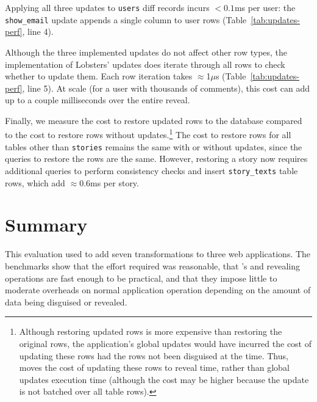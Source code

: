 %
Applying all three updates to \texttt{users} diff records incurs $<0.1$ms per
user: the \texttt{show\_email} update appends a single column to user rows
(Table~\ref{tab:updates-perf}, line 4).
%

%
Although the three implemented updates do not affect other row types, the
implementation of Lobsters' updates does iterate through all rows to check
whether to update them. Each row iteration takes $\approx$1$\mu$s (Table~\ref{tab:updates-perf}, line 5). At scale (\eg for a user with thousands
of comments), this cost can add up to a couple milliseconds over the entire
reveal.
%

Finally, we measure the cost to restore updated rows to the database compared to
the cost to restore rows without updates.\footnote{Although restoring updated
rows is more expensive than restoring the original rows, the application's
global updates would have incurred the cost of updating these rows had the rows not
been disguised at the time. Thus, \sys moves the cost of updating these rows to
reveal time, rather than global updates execution time (although the cost may be higher
because the update is not batched over all table rows).}
%
The cost to restore rows for all tables other than \texttt{stories} remains the
same with or without updates, since the queries to restore the rows are the
same.  However, restoring a story now requires additional queries to perform
consistency checks and insert \texttt{story\_texts} table rows, which add 
$\approx$0.6ms per story.
%

%
\section{Summary} 
This evaluation used \sys to add seven \xxing transformations to three web
applications. The benchmarks show that the effort required was reasonable, that
\sys's \xxing and revealing operations are fast enough to be practical, and that
they impose little to moderate overheads on normal application operation
depending on the amount of data being disguised or revealed.
%
